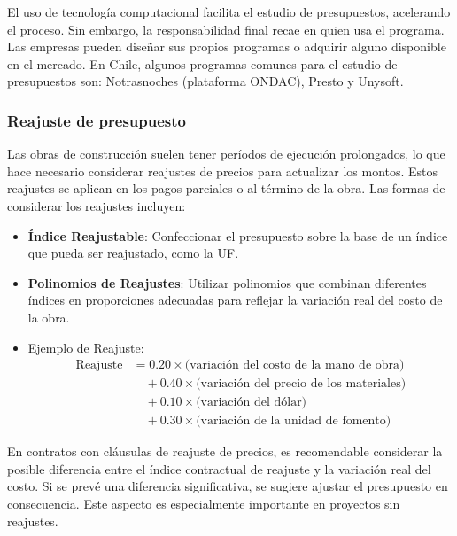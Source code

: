 El uso de tecnología computacional facilita el estudio de presupuestos, acelerando el proceso. Sin embargo, la responsabilidad final recae en quien usa el programa. Las empresas pueden diseñar sus propios programas o adquirir alguno disponible en el mercado. En Chile, algunos programas comunes para el estudio de presupuestos son: Notrasnoches (plataforma ONDAC), Presto y Unysoft.

\subsubsection{Reajuste de presupuesto}

Las obras de construcción suelen tener períodos de ejecución prolongados, lo que hace necesario considerar reajustes de precios para actualizar los montos. Estos reajustes se aplican en los pagos parciales o al término de la obra. Las formas de considerar los reajustes incluyen:

\begin{itemize}
    \item \textbf{Índice Reajustable}: Confeccionar el presupuesto sobre la base de un índice que pueda ser reajustado, como la UF.
    
    \item \textbf{Polinomios de Reajustes}: Utilizar polinomios que combinan diferentes índices en proporciones adecuadas para reflejar la variación real del costo de la obra.
    
    \item Ejemplo de Reajuste:
    \begin{align}
    \text{Reajuste} &= 0.20 \times \text{(variación del costo de la mano de obra)} \nonumber \\
    &\quad + 0.40 \times \text{(variación del precio de los materiales)} \nonumber \\
    &\quad + 0.10 \times \text{(variación del dólar)} \nonumber \\
    &\quad + 0.30 \times \text{(variación de la unidad de fomento)}
    \end{align}  
\end{itemize}

En contratos con cláusulas de reajuste de precios, es recomendable considerar la posible diferencia entre el índice contractual de reajuste y la variación real del costo. Si se prevé una diferencia significativa, se sugiere ajustar el presupuesto en consecuencia. Este aspecto es especialmente importante en proyectos sin reajustes.

